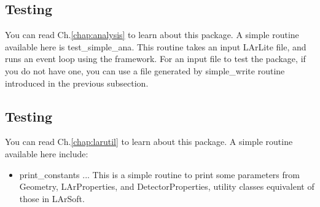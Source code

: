 \subsection{Testing \Analysis}
You can read Ch.\ref{chap:analysis} to learn about this package.
A simple routine available here is {\ttfamily test\_simple\_ana}. This routine takes an input
LArLite \ROOT file, and runs an event loop using the \Analysis framework. For an input file to test
the package, if you do not have one, you can use a file generated by {\ttfamily simple\_write} routine
introduced in the previous subsection.

\subsection{Testing \LArUtil}
You can read Ch.\ref{chap:larutil} to learn about this package. 
A simple routine available here include:
\begin{itemize}
\item {\ttfamily print\_constants} ... This is a simple routine to print some parameters from {\ttfamily Geometry}, {\ttfamily LArProperties}, and {\ttfamily DetectorProperties}, utility classes equivalent of those in LArSoft.
\end{itemize}

